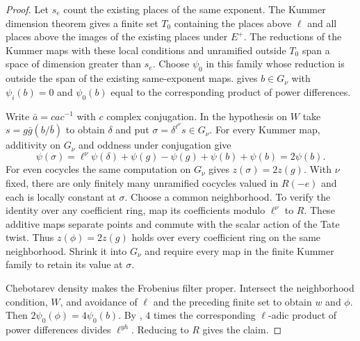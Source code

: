 \begin{proof}
Let $s_e$ count the existing places of the same exponent. The Kummer dimension theorem gives a finite set $T_0$ containing the places above $\ell$ and all places above the images of the existing places under $E^+$. The reductions of the Kummer maps with these local conditions and unramified outside $T_0$ span a space of dimension greater than $s_e$. Choose $\psi_0$ in this family whose reduction is outside the span of the existing same-exponent maps.  gives $b\in G_\nu$ with $\psi_i(b)=0$ and $\psi_0(b)$ equal to the corresponding product of power differences.

Write $\bar a=cac^{-1}$ with $c$ complex conjugation. In the hypothesis on $W$ take $s=g\bar g(b/\bar b)$ to obtain $\delta$ and put $\sigma=\delta^{\ell^\nu}s\in G_\nu$. For every Kummer map, additivity on $G_\nu$ and oddness under conjugation give
\[
 \psi(\sigma)=\ell^\nu\psi(\delta)+\psi(g)-\psi(g)
                  +\psi(b)+\psi(b)=2\psi(b).
\]
For even cocycles the same computation on $G_\nu$ gives $z(\sigma)=2z(g)$. With $\nu$ fixed, there are only finitely many unramified cocycles valued in $R(-e)$ and each is locally constant at $\sigma$. Choose a common neighborhood. To verify the identity over any coefficient ring, map its coefficients modulo $\ell^\nu$ to $R$. These additive maps separate points and commute with the scalar action of the Tate twist. Thus $z(\phi)=2z(g)$ holds over every coefficient ring on the same neighborhood. Shrink it into $G_\nu$ and require every map in the finite Kummer family to retain its value at $\sigma$.

Chebotarev density makes the Frobenius filter proper. Intersect the neighborhood condition, $W$, and avoidance of $\ell$ and the preceding finite set to obtain $w$ and $\phi$. Then $2\psi_0(\phi)=4\psi_0(b)$. By , $4$ times the corresponding $\ell$-adic product of power differences divides $\ell^{yh}$. Reducing to $R$ gives the claim.
\end{proof}

